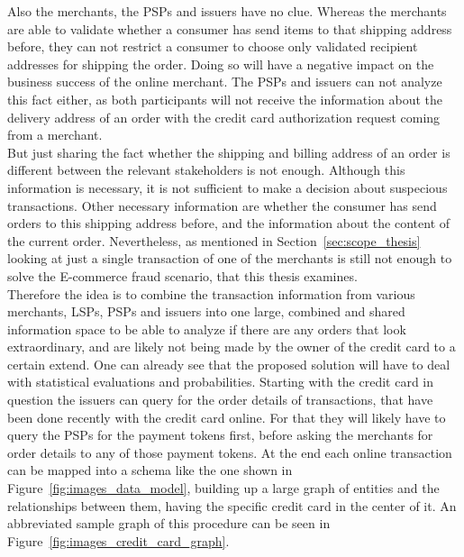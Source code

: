 Also the merchants, the \gls{PSP}s and issuers have no clue. Whereas the merchants are able to validate whether a consumer has send items to that shipping address before, they can not restrict a consumer to choose only validated recipient addresses for shipping the order. Doing so will have a negative impact on the business success of the online merchant. The \gls{PSP}s and issuers can not analyze this fact either, as both participants will not receive the information about the delivery address of an order with the credit card authorization request coming from a merchant. \\

But just sharing the fact whether the shipping and billing address of an order is different between the relevant stakeholders is not enough. Although this information is necessary, it is not sufficient to make a decision about suspecious transactions. Other necessary information are whether the consumer has send orders to this shipping address before, and the information about the content of the current order. Nevertheless, as mentioned in Section~\ref{sec:scope_thesis} looking at just a single transaction of one of the merchants is still not enough to solve the \gls{E-commerce} fraud scenario, that this thesis examines. \\

Therefore the idea is to combine the transaction information from various merchants, \gls{LSP}s, \gls{PSP}s and issuers into one large, combined and shared information space to be able to analyze if there are any orders that look extraordinary, and are likely not being made by the owner of the credit card to a certain extend. One can already see that the proposed solution will have to deal with statistical evaluations and probabilities. Starting with the credit card in question the issuers can query for the order details of transactions, that have been done recently with the credit card online. For that they will likely have to query the \gls{PSP}s for the payment tokens first, before asking the merchants for order details to any of those payment tokens. At the end each online transaction can be mapped into a schema like the one shown in Figure~\ref{fig:images_data_model}, building up a large graph of entities and  the relationships between them, having the specific credit card in the center of it. An abbreviated sample graph of this procedure can be seen in Figure~\ref{fig:images_credit_card_graph}. \\

